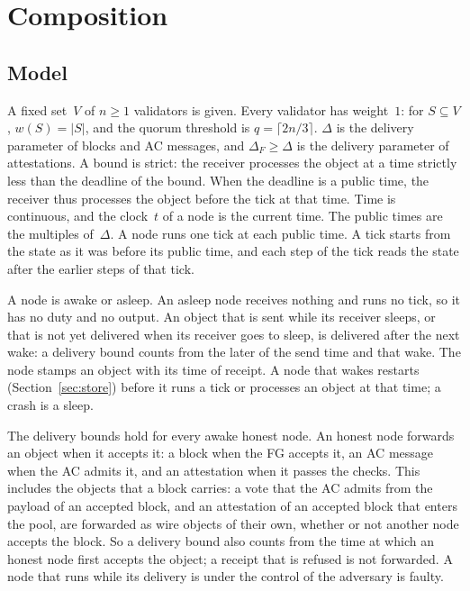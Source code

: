 \section{Composition}\label{sec:composition}

\subsection{Model}\label{sec:model}

A fixed set~$V$ of $n\geq1$ validators is given.  Every validator has
weight~$1$: for $S\subseteq V$, $w(S)=|S|$, and the quorum threshold is
$q=\lceil 2n/3\rceil$.  $\Delta$ is the delivery parameter of blocks and
AC messages, and $\Delta_F\geq\Delta$ is the delivery parameter of
attestations.  A bound is strict: the receiver processes the object at
a time strictly less than the deadline of the bound.  When the deadline is
a public time, the receiver thus processes the object before the tick at
that time.  Time is continuous, and the clock~$t$ of a node is the
current time.  The public times are the multiples of~$\Delta$.  A node
runs one tick at each public time.  A tick starts from the state as it
was before its public time, and each step of the tick reads the state
after the earlier steps of that tick.

A node is awake or asleep.  An asleep node receives nothing and runs no
tick, so it has no duty and no output.  An object that is sent while its
receiver sleeps, or that is not yet delivered when its receiver goes to
sleep, is delivered after the next wake: a delivery bound counts from the
later of the send time and that wake.  The node stamps an object with its
time of receipt.  A node that wakes restarts (Section~\ref{sec:store})
before it runs a tick or processes an object at that time; a crash is a
sleep.

The delivery bounds hold for every awake honest node.  An honest node
forwards an object when it accepts it: a block when the FG accepts it, an
AC message when the AC admits it, and an attestation when it passes the
checks.  This includes the objects that a block carries: a vote that the AC
admits from the payload of an accepted block, and an attestation of an
accepted block that enters the pool, are forwarded as wire objects of their
own, whether or not another node accepts the block.  So a delivery bound also counts from the time at which an honest
node first accepts the object; a receipt that is refused is not forwarded.  A node that runs
while its delivery is under the control of the adversary is faulty.

